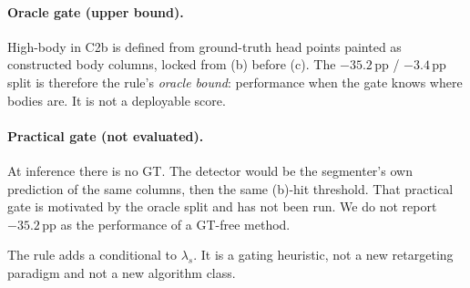 \paragraph{Oracle gate (upper bound).}
High-body in C2b is defined from ground-truth head points painted as
constructed body columns, locked from (b) before (c). The
$-35.2$\,pp / $-3.4$\,pp split is therefore the rule's
\emph{oracle bound}: performance when the gate knows where bodies are.
It is not a deployable score.

\paragraph{Practical gate (not evaluated).}
At inference there is no GT. The detector would be the segmenter's own
prediction of the same columns, then the same (b)-hit threshold. That
practical gate is motivated by the oracle split and has not been run.
We do not report $-35.2$\,pp as the performance of a GT-free method.

The rule adds a conditional to $\lambda_s$. It is a gating heuristic,
not a new retargeting paradigm and not a new algorithm class.

